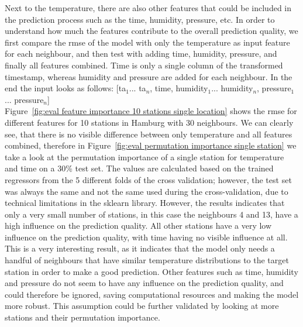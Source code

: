 Next to the temperature, there are also other features that could be included in the prediction process such as the time, humidity, pressure, etc. In order to understand how much the features contribute to the overall prediction quality, we first compare the \gls{rmse} of the model with only the temperature as input feature for each neighbour, and then test with adding time, humidity, pressure, and finally all features combined. Time is only a single column of the transformed timestamp, whereas humidity and pressure are added for each neighbour. In the end the input looks as follows: [ta$_1$... ta$_n$, time, humidity$_1$... humidity$_n$, pressure$_1$... pressure$_n$]\\
Figure~\ref{fig:eval feature importance 10 stations single location} shows the \gls{rmse} for different features for 10 stations in Hamburg with 30 neighbours. We can clearly see, that there is no visible difference between only temperature and all features combined, therefore in Figure~\ref{fig:eval permutation importance single station} we take a look at the permutation importance of a single station for temperature and time on a 30\% test set. The values are calculated based on the trained regressors from the 5 different folds of the cross validation; however, the test set was always the same and not the same used during the cross-validation, due to technical limitations in the sklearn library. However, the results indicates that only a very small number of stations, in this case the neighbours 4 and 13, have a high influence on the prediction quality. All other stations have a very low influence on the prediction quality, with time having no visible influence at all. This is a very interesting result, as it indicates that the model only needs a handful of neighbours that have similar temperature distributions to the target station in order to make a good prediction. Other features such as time, humidity and pressure do not seem to have any influence on the prediction quality, and could therefore be ignored, saving computational resources and making the model more robust. This assumption could be further validated by looking at more stations and their permutation importance.\\ 

